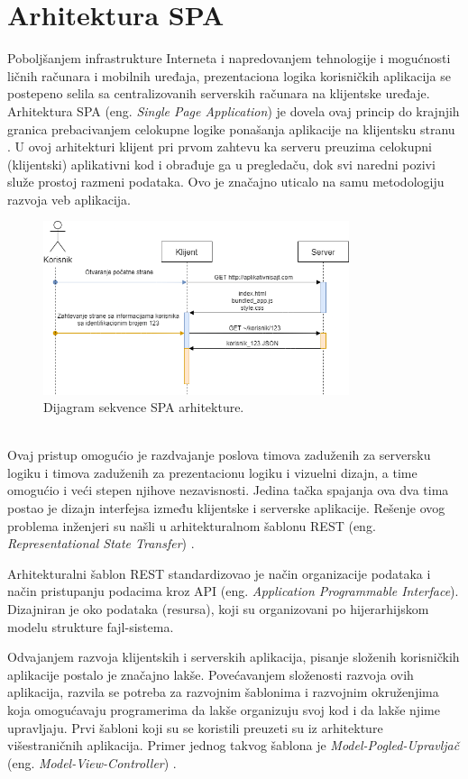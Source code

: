 \documentclass[12pt,oneside]{memoir}
\begin{document}
\chapter{Arhitektura SPA}\label{chap:SPA}
Poboljšanjem infrastrukture Interneta i napredovanjem tehnologije i mogućnosti
ličnih računara
i mobilnih uređaja, prezentaciona logika korisničkih aplikacija se postepeno
selila sa centralizovanih
serverskih računara na klijentske uređaje. Arhitektura SPA (eng. \emph{Single Page Application}) je dovela ovaj princip
do krajnjih granica
prebacivanjem celokupne logike ponašanja aplikacije na klijentsku stranu \cite{SPA}. U ovoj arhitekturi klijent
pri prvom zahtevu
ka serveru preuzima celokupni (klijentski) aplikativni kod i obrađuje ga u
pregledaču, dok
svi naredni pozivi služe prostoj razmeni podataka. Ovo je značajno uticalo
na samu metodologiju razvoja veb aplikacija.
\begin{figure}[!ht]
  \centering
  \includegraphics[width=0.8\textwidth]{slike/SPA_Diagram (3).png}
  \caption{Dijagram sekvence SPA arhitekture.}
  \label{fig:SPA}
\end{figure}\\
Ovaj pristup omogućio je razdvajanje poslova timova zaduženih za
serversku logiku i timova zaduženih za prezentacionu logiku i vizuelni dizajn,
a time omogućio i veći stepen njihove nezavisnosti.
Jedina tačka spajanja ova dva tima postao je dizajn interfejsa
između klijentske i serverske aplikacije. Rešenje ovog problema inženjeri su našli
u arhitekturalnom šablonu REST (eng. \emph{Representational State Transfer}) \cite{REST}.

Arhitekturalni šablon REST standardizovao je način organizacije podataka
i način pristupanju podacima kroz API (eng. \emph{Application Programmable Interface}). 
Dizajniran je oko podataka (resursa), koji su organizovani po hijerarhijskom modelu
strukture fajl-sistema.

Odvajanjem razvoja klijentskih i serverskih aplikacija, pisanje složenih korisničkih aplikacije postalo je značajno lakše.
Povećavanjem složenosti razvoja ovih aplikacija,
razvila se potreba za razvojnim šablonima i razvojnim okruženjima koja omogućavaju
programerima da lakše organizuju svoj kod i da lakše njime upravljaju.
Prvi šabloni koji su se koristili preuzeti su iz arhitekture višestraničnih aplikacija.
Primer jednog takvog šablona je \emph{Model-Pogled-Upravljač} (eng. \emph{Model-View-Controller}) \cite{MVC}. 
\end{document}
